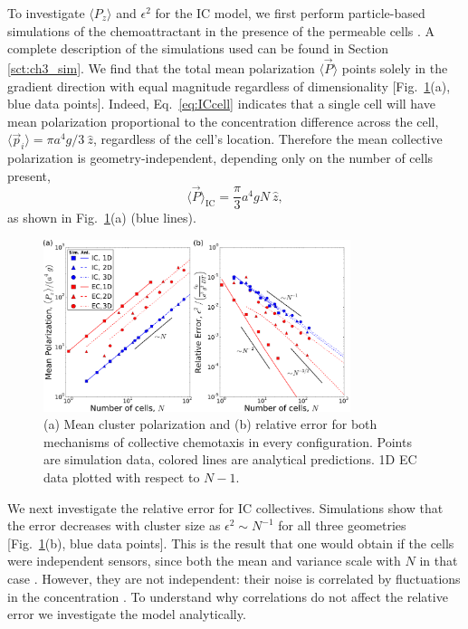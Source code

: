 To investigate $\langle P_z\rangle$ and $\epsilon^2$ for the IC model,
we first perform particle-based simulations of the chemoattractant in the presence of the permeable cells \cite{ch3code}. A complete description of the simulations used can be found in Section \ref{sct:ch3_sim}. We find that the total mean polarization $\langle \vec{P} \rangle$ points solely in the gradient direction with equal magnitude regardless of dimensionality [Fig.\ \ref{fig:ch3_2}(a), blue data points]. Indeed, Eq.\ \ref{eq:ICcell} indicates that a single cell will have mean polarization proportional to the concentration difference across the cell,
$\langle \vec{p}_i \rangle = \pi a^4g/3 \ \hat{z}$,
regardless of the cell's location.
Therefore the mean collective polarization is geometry-independent, depending only on the number of cells present,
\begin{equation} \label{eq:ICmean}
    \langle \vec{P} \rangle_\text{IC} = \frac{\pi}{3} a^4gN \ \hat{z},
\end{equation}
as shown in Fig.\ \ref{fig:ch3_2}(a) (blue lines).

\begin{figure}[ht]
    \centering
        \includegraphics[width=0.8\textwidth]{../fig/ch3_fig2.png}
    \caption{(a) Mean cluster polarization and (b) relative error for both mechanisms of collective chemotaxis in every configuration. Points are simulation data, colored lines are analytical predictions. 1D EC data plotted with respect to $N-1$.} \label{fig:ch3_2}
\end{figure}

We next investigate the relative error for IC collectives. Simulations show that the error decreases with cluster size as
$\epsilon^2 \sim N^{-1}$
for all three geometries [Fig.\ \ref{fig:ch3_2}(b), blue data points]. This is the result that one would obtain if the cells were independent sensors, since both the mean and variance scale with $N$ in that case \cite{simons2004many}. However, they are not independent: their noise is correlated by fluctuations in the concentration \cite{fancher2016fundamental,mugler2016limits}. To understand why correlations do not affect the relative error we investigate the model analytically.


